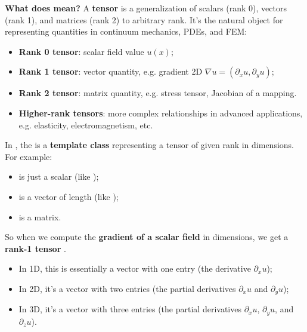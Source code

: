 \begin{itemize}
    \textcolor{Green3}{ \textbf{What does  mean?}} A \textbf{tensor} is a generalization of scalars (rank 0), vectors (rank 1), and matrices (rank 2) to arbitrary rank. It's the natural object for representing quantities in continuum mechanics, PDEs, and FEM:
    \begin{itemize}
        \item \textbf{Rank 0 tensor}: scalar field value $u(x)$;
        \item \textbf{Rank 1 tensor}: vector quantity, e.g. gradient 2D $\nabla u = \left(\partial_x u, \partial_y u\right)$;
        \item \textbf{Rank 2 tensor}: matrix quantity, e.g. stress tensor, Jacobian of a mapping.
        \item \textbf{Higher-rank tensors}: more complex relationships in advanced applications, e.g. elasticity, electromagnetism, etc.
    \end{itemize}
    In , the  is a \textbf{template class} representing a tensor of given rank in  dimensions. For example:
    \begin{itemize}
        \item {} is just a scalar (like );
        \item {} is a vector of length  (like );
        \item {} is a  matrix.
    \end{itemize}
    So when we compute the \textbf{gradient of a scalar field} in  dimensions, we get a \textbf{rank-1 tensor} .
    \begin{itemize}
        \item In 1D, this is essentially a vector with one entry (the derivative $\partial_x u$);
        \item In 2D, it's a vector with two entries (the partial derivatives $\partial_x u$ and $\partial_y u$);
        \item In 3D, it's a vector with three entries (the partial derivatives $\partial_x u$, $\partial_y u$, and $\partial_z u$).
    \end{itemize}
\end{itemize}

